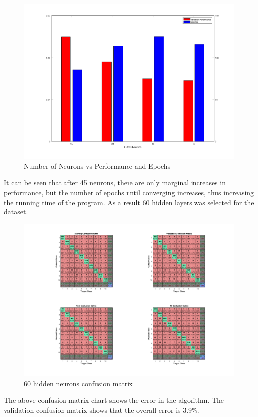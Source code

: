 \begin{figure}[H]
    \includegraphics[width=0.7\linewidth]{../../pracs/week7/images/neurons_plot}
    \centering
    \caption{Number of Neurons vs Performance and Epochs}
\end{figure}

It can be seen that after 45 neurons, there are only marginal increases in performance, but the number of epochs until converging increases, thus increasing the running time of the program.
As a result 60 hidden layers was selected for the dataset.

\begin{figure}[H]
    \includegraphics[width=\linewidth]{../../pracs/week7/images/60_hidden_neurons_confusion}
    \centering
    \caption{60 hidden neurons confusion matrix}
\end{figure}

The above confusion matrix chart shows the error in the algorithm.
The validation confusion matrix shows that the overall error is 3.9\%.

